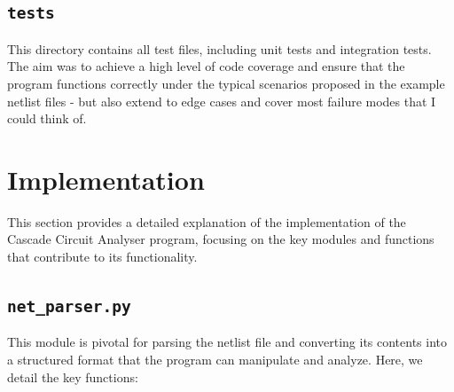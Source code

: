 \documentclass[conference]{IEEEtran}
\begin{document}
\subsection{\textbf{\texttt{tests}}}
This directory contains all test files, including unit tests and integration tests.
The aim was to achieve a high level of code coverage and ensure that the program functions correctly under the typical scenarios proposed in the
example netlist files - but also extend to edge cases and cover most failure modes that I could think of.
\section{Implementation}
This section provides a detailed explanation of the implementation of the Cascade Circuit Analyser program, focusing on the key modules and functions that contribute to its functionality.

\subsection{\textbf{\texttt{net\_parser.py}}}
This module is pivotal for parsing the netlist file and converting its contents into a structured format that the program can manipulate and analyze. Here, we detail the key functions:
\end{document}
